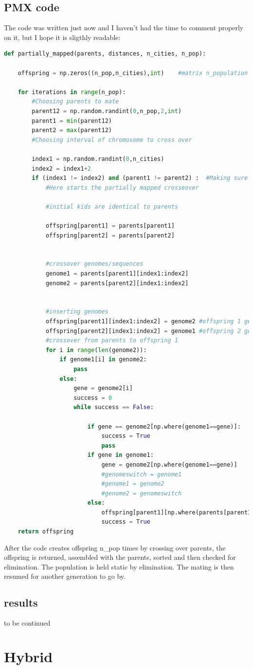 \documentclass[10pt, a4paper]{article}
\begin{document}
\subsection{PMX code}
The code was written just now and I haven't had the time to comment properly on it, but I hope it is sligthly readable:
\begin{lstlisting}[language = Python]
 def partially_mapped(parents, distances, n_cities, n_pop):
    
    offspring = np.zeros((n_pop,n_cities),int)    #matrix n_population x n_cities

    for iterations in range(n_pop):
        #Choosing parents to mate
        parent12 = np.random.randint(0,n_pop,2,int)
        parent1 = min(parent12)
        parent2 = max(parent12)
        #Choosing interval of chromosome to cross over

        index1 = np.random.randint(0,n_cities)
        index2 = index1+2
        if (index1 != index2) and (parent1 != parent2) :  #Making sure parents are different and -
            #Here starts the partially mapped crosseover

            #initial kids are identical to parents

            offspring[parent1] = parents[parent1]
            offspring[parent2] = parents[parent2]


            #crossover genomes/sequences
            genome1 = parents[parent1][index1:index2]
            genome2 = parents[parent2][index1:index2]
            

            #inserting genomes
            offspring[parent1][index1:index2] = genome2 #offspring 1 gets sequence from parent 2
            offspring[parent2][index1:index2] = genome1 #offspring 2 gets sequence from parent 1
            #crossover from parents to offspring 1
            for i in range(len(genome2)):
                if genome1[i] in genome2:
                    pass
                else:
                    gene = genome2[i]
                    success = 0
                    while success == False:

                        if gene == genome2[np.where(genome1==gene)]:
                            success = True
                            pass
                        if gene in genome1:
                            gene = genome2[np.where(genome1==gene)]
                            #genomeswitch = genome1
                            #genome1 = genome2
                            #genome2 = genomeswitch
                        else:
                            offspring[parent1][np.where(parents[parent1]==gene)] = genome1[i]
                            success = True
    return offspring
\end{lstlisting}
After the code creates offspring n\_pop times by crossing over parents, the offspring is returned, assembled with the parents, sorted and then checked for elimination.
The population is held static by elimination. The mating is then resumed for another generation to go by.

\subsection{results}
to be continued

\section{Hybrid}
\end{document}

